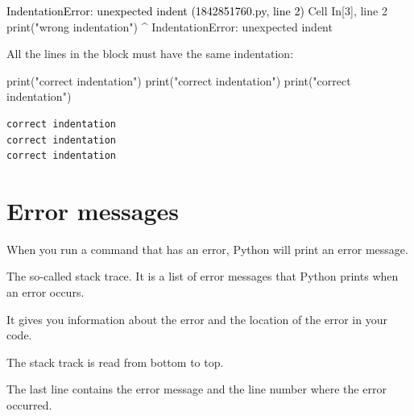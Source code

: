 \documentclass[
  letterpaper,
  DIV=11,
  numbers=noendperiod]{scrreprt}
\newenvironment{Shaded}{\begin{snugshade}}{\end{snugshade}}
\newcommand{\BuiltInTok}[1]{\textcolor[rgb]{0.00,0.23,0.31}{#1}}
\newcommand{\NormalTok}[1]{\textcolor[rgb]{0.00,0.23,0.31}{#1}}
\newcommand{\StringTok}[1]{\textcolor[rgb]{0.13,0.47,0.30}{#1}}
\begin{document}
\begin{Highlighting}
\textcolor{black}{IndentationError: unexpected indent (1842851760.py, line 2)}
\textcolor{black}{}\textcolor{QuartoInternalColor1}{  Cell }\textcolor{QuartoInternalColor2}{In[3], line 2}\textcolor{QuartoInternalColor1}{}\textcolor{QuartoInternalColor3}{}
\textcolor{QuartoInternalColor3}{}\textcolor{QuartoInternalColor4}{    print("wrong indentation")}\textcolor{QuartoInternalColor3}{}
\textcolor{QuartoInternalColor3}{}\textcolor{QuartoInternalColor3}{    ^}\textcolor{QuartoInternalColor3}{}
\textcolor{QuartoInternalColor3}{}\textcolor{QuartoInternalColor4}{IndentationError}\textcolor{QuartoInternalColor3}{}\textcolor{QuartoInternalColor4}{:}\textcolor{QuartoInternalColor3}{ unexpected indent}
\end{Highlighting}

All the lines in the block must have the same indentation:

\begin{Shaded}
\begin{Highlighting}[]
    \BuiltInTok{print}\NormalTok{(}\StringTok{"correct indentation"}\NormalTok{) }
    \BuiltInTok{print}\NormalTok{(}\StringTok{"correct indentation"}\NormalTok{)}
    \BuiltInTok{print}\NormalTok{(}\StringTok{"correct indentation"}\NormalTok{)}
\end{Highlighting}
\end{Shaded}

\begin{verbatim}
correct indentation
correct indentation
correct indentation
\end{verbatim}

\section*{Error messages}\label{error-messages}


When you run a command that has an error, Python will print an error
message.

The so-called stack trace. It is a list of error messages that Python
prints when an error occurs.

It gives you information about the error and the location of the error
in your code.

The stack track is read from bottom to top.

The last line contains the error message and the line number where the
error occurred.
\end{document}

